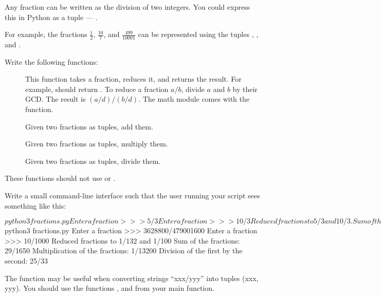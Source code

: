 \documentclass[11pt]{cselabheader}
\begin{document}
\begin{ex}[fractions.py] Any fraction can be written as the division
of two integers. You could express this in Python as a tuple ---
.

  For example, the fractions $\frac{1}{2}$, $\frac{10}{7}$, and
  $\frac{499}{10001}$ can be represented using the tuples
  , , and .

  Write the following functions: 

  \begin{description}
    \item[] This function takes a fraction, reduces it, and returns the result.
        For example,  should return .
        To reduce a fraction $a/b$, divide $a$ and $b$ by their GCD.
        The result is $(a/d) / (b/d)$.
        The math module comes with the  function.
    \item[] Given two fractions as tuples, add them.
    \item[] Given two fractions as tuples, multiply them.
    \item[] Given two fractions as tuples, divide them.
  \end{description}
  These functions should not use  or . 

  Write a small command-line interface such that the user running your
  script sees something like this:

  \begin{bashcode}
$ python3 fractions.py
Enter a fraction >>> 5/3
Enter a fraction >>> 10/3
Reduced fractions to 5/3 and 10/3.
Sum of the fractions: 3/1.
Multiplication of the fractions: 50/9.
Division of the first by the second: 1/2 .
$ python3 fractions.py
Enter a fraction >>> 3628800/479001600 
Enter a fraction >>> 10/1000
Reduced fractions to 1/132 and 1/100 
Sum of the fractions: 29/1650 
Multiplication of the fractions: 1/13200 
Division of the first by the second: 25/33 

  \end{bashcode}

  The  function may be useful when converting strings ``xxx/yyy'' into 
  tuples (xxx, yyy).
  You should use the functions , and
   from your main function.
\end{ex}
\end{document}
